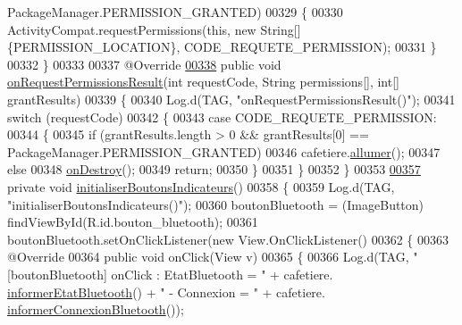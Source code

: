 \begin{DoxyCode}
      PackageManager.PERMISSION\_GRANTED)
00329         \{
00330             ActivityCompat.requestPermissions(\textcolor{keyword}{this}, \textcolor{keyword}{new} String[]\{PERMISSION\_LOCATION\}, 
      CODE\_REQUETE\_PERMISSION);
00331         \}
00332     \}
00333 
00337     @Override
\hyperlink{classcom_1_1example_1_1ekawa_1_1_ihm_a708f7d3adb02a942cb67a5d6ec42b64f}{00338}     \textcolor{keyword}{public} \textcolor{keywordtype}{void} \hyperlink{classcom_1_1example_1_1ekawa_1_1_ihm_a708f7d3adb02a942cb67a5d6ec42b64f}{onRequestPermissionsResult}(\textcolor{keywordtype}{int} requestCode, String permissions[],
       \textcolor{keywordtype}{int}[] grantResults)
00339     \{
00340         Log.d(TAG, \textcolor{stringliteral}{"onRequestPermissionsResult()"});
00341         \textcolor{keywordflow}{switch} (requestCode)
00342         \{
00343             \textcolor{keywordflow}{case} CODE\_REQUETE\_PERMISSION:
00344             \{
00345                 \textcolor{keywordflow}{if} (grantResults.length > 0 && grantResults[0] == PackageManager.PERMISSION\_GRANTED)
00346                     cafetiere.\hyperlink{classcom_1_1example_1_1ekawa_1_1_cafetiere_afa405dc114a82fe74c06ff0971fa6cfc}{allumer}();
00347                 \textcolor{keywordflow}{else}
00348                     \hyperlink{classcom_1_1example_1_1ekawa_1_1_ihm_a5ae27969ec39afede5d0cd36b469f145}{onDestroy}();
00349                 \textcolor{keywordflow}{return};
00350             \}
00351         \}
00352     \}
00353 
\hyperlink{classcom_1_1example_1_1ekawa_1_1_ihm_ae38db41c355bc415b46f21f9d608d4b9}{00357}     \textcolor{keyword}{private} \textcolor{keywordtype}{void} \hyperlink{classcom_1_1example_1_1ekawa_1_1_ihm_ae38db41c355bc415b46f21f9d608d4b9}{initialiserBoutonsIndicateurs}()
00358     \{
00359         Log.d(TAG, \textcolor{stringliteral}{"initialiserBoutonsIndicateurs()"});
00360         boutonBluetooth = (ImageButton) findViewById(R.id.bouton\_bluetooth);
00361         boutonBluetooth.setOnClickListener(\textcolor{keyword}{new} View.OnClickListener()
00362         \{
00363             @Override
00364             \textcolor{keyword}{public} \textcolor{keywordtype}{void} onClick(View v)
00365             \{
00366                 Log.d(TAG, \textcolor{stringliteral}{"[boutonBluetooth] onClick : EtatBluetooth = "} + cafetiere.
      \hyperlink{classcom_1_1example_1_1ekawa_1_1_cafetiere_aeff88ad385713a7897074dcdb76077a5}{informerEtatBluetooth}() + \textcolor{stringliteral}{" - Connexion = "} + cafetiere.
      \hyperlink{classcom_1_1example_1_1ekawa_1_1_cafetiere_a97d9ca4701a961fe8865ecfa1d5bf64a}{informerConnexionBluetooth}());

\end{DoxyCode}
